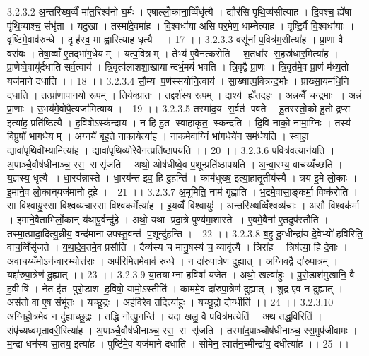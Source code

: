 3.2.3.2
अ॒न्तरि॑ख्ष॒व्वैँ मा॑त॒रिश्व॑नो घ॒र्मः । ए॒षाल्लोँ॒काना॒व्विँधृ॑त्यै । द्यौर॑सि पृथि॒व्य॑सीत्या॑ह । दि॒वश्च॒ ह्ये॑षा पृ॑थि॒व्याश्च॒ संभृ॑ता । यदु॒खा । तस्मा॑दे॒वमा॑ह । वि॒श्वधा॑या असि पर॒मेण॒ धाम्नेत्या॑ह । वृष्टि॒र्वै वि॒श्वधा॑याः । वृष्टि॑मे॒वाव॑रुन्धे । दृह॑स्व॒ मा ह्वा॒रित्या॑ह॒ धृत्यै ।। 17 ।।
3.2.3.3
वसू॑नां प॒वित्र॑म॒सीत्या॑ह । प्रा॒णा वै वस॑वः । तेषा॒व्वाँ ए॒तद्भा॑ग॒धेयम् । यत्प॒वित्रम् । तेभ्य॑ ए॒वैन॑त्करोति । श॒तधा॑र स॒हस्र॑धार॒मित्या॑ह । प्रा॒णेष्वे॒वायु॑र्दधाति सर्व॒त्वाय॑ । त्रि॒वृत्प॑लाशशा॒खायान्दर्भ॒मयं॑ भवति । त्रि॒वृद्वै प्रा॒णः । त्रि॒वृत॑मे॒व प्रा॒णं म॑ध्य॒तो यज॑माने दधाति ।। 18 ।।
3.2.3.4
सौ॒म्य प॒र्णस्स॑योनि॒त्वाय॑ । सा॒ख्षात्प॒वित्र॑न्द॒र्भाः । प्राख्सा॒यमधि॒नि द॑धाति । तत्प्रा॑णापा॒नयो॑ रू॒पम् । ति॒र्यक्प्रा॒तः । तद्दर्श॑स्य रू॒पम् । दा॒र्श्य ह्ये॑तदहः॑ । अन्न॒व्वैँ च॒न्द्रमाः । अन्नं॑ प्रा॒णाः । उ॒भय॑मे॒वोपै॒त्यजा॑मित्वाय ।। 19 ।।
3.2.3.5
तस्मा॑द॒य स॒र्वत॑ पवते । हु॒तस्स्तो॒को हु॒तो द्र॒प्स इत्या॑ह॒ प्रति॑ष्ठित्यै । ह॒विषोऽस्क॑न्दाय । न हि हु॒त स्वाहा॑कृत॒ स्कन्द॑ति । दि॒वि नाको॒ नामा॒ग्निः । तस्य॑ वि॒प्रुषो॑ भाग॒धेयम् । अ॒ग्नये॑ बृह॒ते नाका॒येत्या॑ह । नाक॑मे॒वाग्निं भा॑ग॒धेये॑न॒ सम॑र्धयति । स्वाहा॒ द्यावा॑पृथि॒वीभ्या॒मित्या॑ह । द्यावा॑पृथि॒व्योरे॒वैन॒त्प्रति॑ष्ठापयति ।। 20 ।।
3.2.3.6
प॒वित्र॑व॒त्यान॑यति । अ॒पाञ्चै॒वौष॑धीनाञ्च॒ रस॒॒ ससृ॑जति । अथो॒ ओष॑धीष्वे॒व प॒शून्प्रति॑ष्ठापयति । अ॒न्वा॒रभ्य॒ वाच॑य्यँच्छति । य॒ज्ञस्य॒ धृत्यै । धा॒रय॑न्नास्ते । धा॒रय॑न्त इव॒ हि दु॒हन्ति॑ । काम॑धुख्ष॒ इत्या॒हातृ॒तीय॑स्यै । त्रय॑ इ॒मे लो॒काः । इ॒माने॒व लो॒कान्‌यज॑मानो दुहे ।। 21 ।।
3.2.3.7
अ॒मूमिति॒ नाम॑ गृह्णाति । भ॒द्रमे॒वासा॒ङ्कर्मा॒ विष्क॑रोति । सा वि॒श्वायु॒स्सा वि॒श्वव्य॑चा॒स्सा वि॒श्वक॒र्मेत्या॑ह । इ॒यव्वैँ वि॒श्वायुः॑ । अ॒न्तरि॑ख्षव्विँ॒श्वव्य॑चाः । अ॒सौ वि॒श्वक॑र्मा । इ॒माने॒वैताभि॑र्लो॒कान्‌ य॑थापू॒र्वन्दु॑हे । अथो॒ यथा प्रदा॒त्रे पुण्य॑मा॒शास्ते । ए॒वमे॒वैना॑ ए॒तदुप॑स्तौति । तस्मा॒त्प्रादा॒दित्यु॒न्नीय॒ वन्द॑माना उपस्तु॒वन्त॑ प॒शून्दु॑हन्ति ।। 22 ।।
3.2.3.8
ब॒हु दु॒ग्धीन्द्रा॑य दे॒वेभ्यो॑ ह॒विरिति॒ वाच॒व्विँसृ॑जते । य॒था॒दे॒व॒तमे॒व प्रसौ॑ति । दैव्य॑स्य च मानु॒षस्य॑ च॒ व्यावृ॑त्यै । त्रिरा॑ह । त्रिष॑त्या॒ हि दे॒वाः । अवा॑चय्यँ॒मोऽन॑न्वार॒भ्योत्त॑राः । अप॑रिमितमे॒वाव॑ रुन्धे । न दा॑रुपा॒त्रेण॑ दुह्यात् । अ॒ग्नि॒वद्वै दा॑रुपा॒त्रम् । यद्दा॑रुपा॒त्रेण॑ दु॒ह्यात् ।। 23 ।।
3.2.3.9
या॒तयाम्ना ह॒विषा॑ यजेत । अथो॒ खल्वा॑हुः । पु॒रो॒डाश॑मुखानि॒ वै ह॒वीषि॑ । नेत इ॑त पुरो॒डाश॑ ह॒विषो॒ यामो॒ऽस्तीति॑ । काम॑मे॒व दा॑रुपा॒त्रेण॑ दुह्यात् । शू॒द्र ए॒व न दु॑ह्यात् । अस॑तो॒ वा ए॒ष संभू॑तः । यच्छू॒द्रः । अह॑विरे॒व तदित्या॑हुः । यच्छू॒द्रो दोग्धीति॑ ।। 24 ।।
3.2.3.10
अ॒ग्नि॒हो॒त्रमे॒व न दु॑ह्याच्छू॒द्रः । तद्धि नोत्पु॒नन्ति॑ । य॒दा खलु॒ वै प॒वित्र॑म॒त्येति॑ । अथ॒ तद्ध॒विरिति॑ । संपृ॑च्यध्वमृतावरी॒रित्या॑ह । अ॒पाञ्चै॒वौष॑धीनाञ्च॒ रस॒॒ स सृ॑जति । तस्मा॑द॒पाञ्चौष॑धीनाञ्च॒ रस॒मुप॑जीवामः । म॒न्द्रा धन॑स्य सा॒तय॒ इत्या॑ह । पुष्टि॑मे॒व यज॑माने दधाति । सोमे॑न॒ त्वात॑न॒च्मीन्द्रा॑य॒ दधीत्या॑ह ।। 25 ।।
